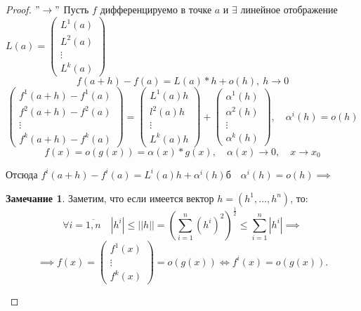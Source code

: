 \documentclass{report}
\theoremstyle{definition}
\newtheorem*{remark}{Замечание}
\begin{document}
\begin{proof}
  $"\rightarrow"$ Пусть $f$ дифференцируемо в точке $a$ и $\exists$ линейное отображение $L(a) = \left(
    \begin{array}{c}
      L^1(a) \\
      L^2(a) \\
      \vdots \\
      L^k(a)
    \end{array}
    \right)$
  \begin{equation*}
    f(a+h) - f(a) = L(a)*h + o(h), \ h\rightarrow 0
  \end{equation*}
  \begin{equation*}
    \left(
    \begin{array}{c}
      f^1(a+h) - f^1(a) \\
      f^2(a+h) - f^2(a) \\
      \vdots            \\
      f^k(a+h) - f^k(a)
    \end{array}
    \right) = \left(
    \begin{array}{c}
      L^1(a)h \\
      l^2(a)h \\
      \vdots  \\
      L^k(a)h
    \end{array}
    \right) + \left(
    \begin{array}{c}
      \alpha^1(h) \\
      \alpha^2(h) \\
      \vdots      \\
      \alpha^k(h)
    \end{array}
    \right), \quad \alpha^i(h) = o(h)
  \end{equation*}
  \begin{equation*}
    f(x) = o(g(x)) = \alpha(x) * g(x), \quad \alpha(x)\rightarrow0, \quad x \rightarrow x_0
  \end{equation*}

  Отсюда $f^i(a+h) - f^i(a) = L^i(a)h + \alpha^i(h)б \quad \alpha^i(h) = o(h) \implies$

  \begin{remark}
    Заметим, что если имеется вектор $h = (h^1,\ldots, h^n)$, то:
  \begin{equation*}
    \forall i = \overline{1,n} \quad |h^i| \leqslant ||h|| = (\sum_{i=1}^{n}(h^i)^2)^\frac{1}{2} \leqslant
    \sum_{i=1}^{n}|h^i| \implies
  \end{equation*}
  \begin{equation*}
    \implies f(x) = \left(
      \begin{array}{c}
        f^1(x) \\
        \vdots \\
        f^k(x)
      \end{array}
      \right) = o(g(x)) \iff f^i(x) = o(g(x)).
  \end{equation*}


\end{remark}
\end{proof}
\end{document}
